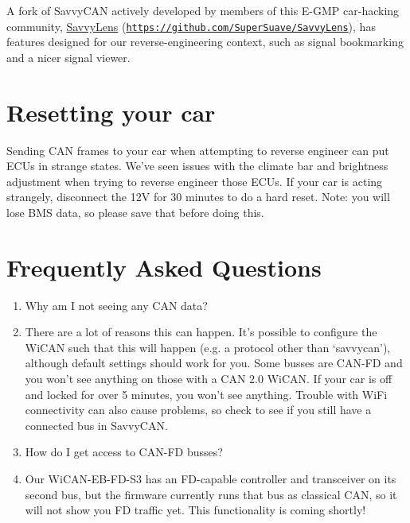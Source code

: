 \documentclass[superscriptaddress,onecolumn,floatfix]{revtex4-2}
\begin{document}
A fork of SavvyCAN actively developed by members of this E-GMP car-hacking community, \href{https://github.com/SuperSuave/SavvyLens}{SavvyLens} (\href{https://github.com/SuperSuave/SavvyLens}{\nolinkurl{https://github.com/SuperSuave/SavvyLens}}), has features designed for our reverse-engineering context, such as signal bookmarking and a nicer signal viewer.

\section{Resetting your car}

Sending CAN frames to your car when attempting to reverse engineer can put ECUs in strange states. We've seen issues with the climate bar and brightness adjustment when trying to reverse engineer those ECUs. If your car is acting strangely, disconnect the 12V for 30 minutes to do a hard reset. Note: you will lose BMS data, so please save that before doing this.

\vspace*{-2\baselineskip}
\section{Frequently Asked Questions}
\begin{enumerate}
  \item[Q:] Why am I not seeing any CAN data?
  \item[A:] There are a lot of reasons this can happen. It's possible to configure the WiCAN such that this will happen (e.g. a protocol other than `savvycan'), although default settings should work for you. Some busses are CAN-FD and you won't see anything on those with a CAN 2.0 WiCAN. If your car is off and locked for over 5 minutes, you won't see anything. Trouble with WiFi connectivity can also cause problems, so check to see if you still have a connected bus in SavvyCAN.
  \item[Q:] How do I get access to CAN-FD busses?
  \item[A:] Our WiCAN-EB-FD-S3 has an FD-capable controller and transceiver on its second bus, but the firmware currently runs that bus as classical CAN, so it will not show you FD traffic yet. This functionality is coming shortly!
\end{enumerate}
\appendix 
\end{document}
